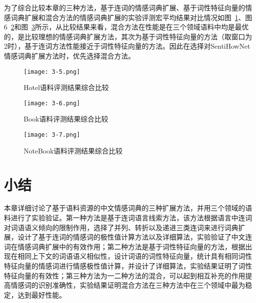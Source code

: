 为了综合比较本章的三种方法，基于连词的情感词典扩展、基于词性特征向量的情感词典扩展和混合方法的情感词典扩展的实验评测宏平均结果对比情况如图~\ref{fig3-5}、图6~\ref{fig3-6}和图~\ref{fig3-7}所示，从比较结果来看，混合方法在性能是在三个领域语料中均是最优的，是比较理想的情感词典扩展方法，其次为基于词性特征向量的方法（取窗口为2时），基于连词方法性能接近于词性特征向量的方法。因此在选择对SentiHowNet情感词典扩展方法时，优先选择混合方法。

\begin{figure}[htp]
\centering
\texttt{[image: 3-5.png]}
\caption{Hotel语料评测结果综合比较}
\label{fig3-5}
\end{figure}

\begin{figure}[htp]
\centering
\texttt{[image: 3-6.png]}
\caption{Book语料评测结果综合比较}
\label{fig3-6}
\end{figure}

\begin{figure}[htp]
\centering
\texttt{[image: 3-7.png]}
\caption{NoteBook语料评测结果综合比较}
\label{fig3-7}
\end{figure}

\section{小结}
本章详细讨论了基于语料资源的中文情感词典的三种扩展方法，并用三个领域的语料进行了实验验证。第一种方法是基于连词语言线索方法，该方法根据语言中连词对词语语义倾向的限制作用，选择了并列、转折以及递进三类连词来进行词典扩展，设计了基于连词的情感词的极性值计算方法以及详细算法，实验验证了中文连词在情感词典扩展中的有效作用；第二种方法是基于词性特征向量的方法，根据出现在相同上下文的词语语义相似性，设计词语的词性特征向量，统计具有相同词性特征向量的情感词进行情感极性值计算，并设计了详细算法，实验结果证明了词性特征向量的有效性；第三种方法为一二种方法的混合，可以起到相互补充的作用提高情感词的识别准确性，实验结果证明混合方法在三种方法中在三个领域中最为稳定，达到最好性能。

